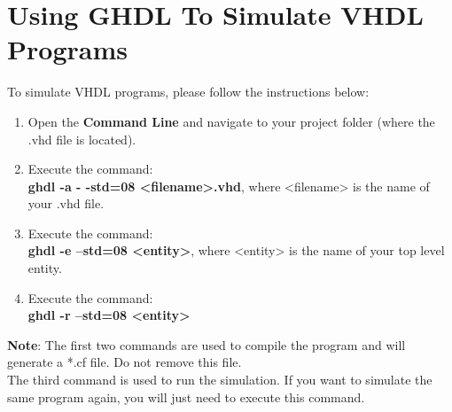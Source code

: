 \section{Using GHDL To Simulate VHDL Programs}
To simulate VHDL programs, please follow the instructions below:
\begin{enumerate}
\item Open the \textbf{Command Line} and navigate to your project folder (where the .vhd file is located).
\item Execute the command:\\  \textbf{ghdl -a - -std=08 <filename>.vhd}, where <filename> is the name of your .vhd file.
\item Execute the command:\\  \textbf{ghdl -e --std=08 <entity>}, where <entity> is the name of your top level entity.
\item Execute the command:\\  \textbf{ghdl -r --std=08 <entity>}
\end{enumerate}
\textbf{Note}: The first two commands are used to compile the program and will generate a *.cf file. Do not remove this file.\\
The third command is used to run the simulation. If you want to simulate the same program again, you will just need to execute this command. 